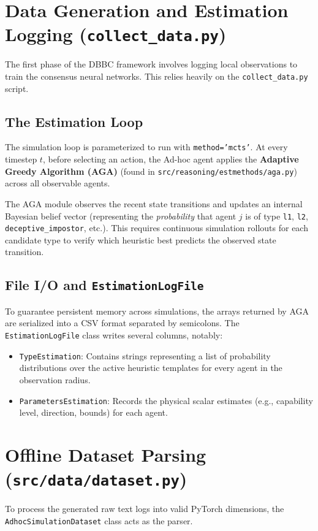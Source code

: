 \documentclass[11pt]{article}
\begin{document}
\section{Data Generation and Estimation Logging (\texttt{collect\_data.py})}
The first phase of the DBBC framework involves logging local observations to train the consensus neural networks. This relies heavily on the \texttt{collect\_data.py} script.

\subsection{The Estimation Loop}
The simulation loop is parameterized to run with \texttt{method='mcts'}. At every timestep $t$, before selecting an action, the Ad-hoc agent applies the \textbf{Adaptive Greedy Algorithm (AGA)} (found in \texttt{src/reasoning/estmethods/aga.py}) across all observable agents. 

The AGA module observes the recent state transitions and updates an internal Bayesian belief vector (representing the \textit{probability} that agent $j$ is of type \texttt{l1}, \texttt{l2}, \texttt{deceptive\_impostor}, etc.). This requires continuous simulation rollouts for each candidate type to verify which heuristic best predicts the observed state transition.

\subsection{File I/O and \texttt{EstimationLogFile}}
To guarantee persistent memory across simulations, the arrays returned by AGA are serialized into a CSV format separated by semicolons. The \texttt{EstimationLogFile} class writes several columns, notably:
\begin{itemize}
    \item \texttt{TypeEstimation}: Contains strings representing a list of probability distributions over the active heuristic templates for every agent in the observation radius.
    \item \texttt{ParametersEstimation}: Records the physical scalar estimates (e.g., capability level, direction, bounds) for each agent.
\end{itemize}

\section{Offline Dataset Parsing (\texttt{src/data/dataset.py})}
To process the generated raw text logs into valid PyTorch dimensions, the \texttt{AdhocSimulationDataset} class acts as the parser. 
\end{document}
